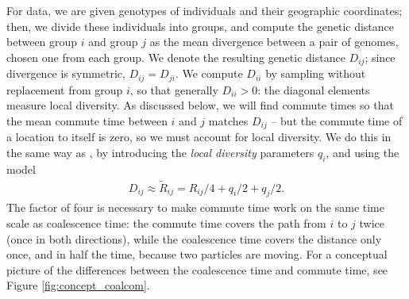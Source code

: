 \documentclass{article}
\newcommand{\comdist}{\widetilde{R}}
\begin{document}
For data, we are given genotypes of individuals and their geographic coordinates;
then, we divide these individuals into groups,
and compute the genetic distance between group $i$ and group $j$
as the mean divergence between a pair of genomes, chosen one from each group.
We denote the resulting genetic distance $D_{ij}$;
since divergence is symmetric, $D_{ij} = D_{ji}$.
We compute $D_{ii}$ by sampling without replacement from group $i$,
so that generally $D_{ii} > 0$: the diagonal elements measure local diversity.
As discussed below, we will find commute times so that the mean commute time between
$i$ and $j$ matches $D_{ij}$ -- but the commute time of a location to itself is zero,
so we must account for local diversity.
We do this in the same way as \citet{petkova2016visualizing},
by introducing the \emph{local diversity} parameters $q_i$,
and using the model
\begin{align} \label{eq:commute_approx}
	D_{ij} \approx \comdist_{ij} = R_{ij}/4 + q_{i}/2 + q_{j}/2 .
\end{align}
The factor of four is necessary to make commute time work on the same time scale as coalescence time:
the commute time covers the path from $i$ to $j$ twice
(once in both directions),
while the coalescence time covers the distance only once,
and in half the time, because two particles are moving.
For a conceptual picture of the differences between the coalescence time and commute time,
see Figure \ref{fig:concept_coalcom}. 
\end{document}
